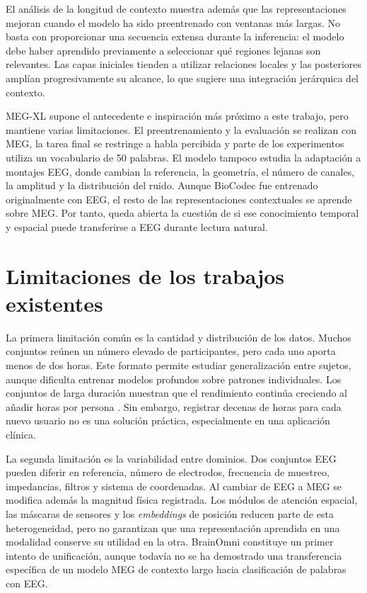 El análisis de la longitud de contexto muestra además que las representaciones mejoran cuando el modelo ha sido preentrenado con ventanas más largas. No basta con proporcionar una secuencia extensa durante la inferencia: el modelo debe haber aprendido previamente a seleccionar qué regiones lejanas son relevantes. Las capas iniciales tienden a utilizar relaciones locales y las posteriores amplían progresivamente su alcance, lo que sugiere una integración jerárquica del contexto.

MEG-XL supone el antecedente e inspiración más próximo a este trabajo, pero mantiene varias limitaciones. El preentrenamiento y la evaluación se realizan con MEG, la tarea final se restringe a habla percibida y parte de los experimentos utiliza un vocabulario de 50 palabras. El modelo tampoco estudia la adaptación a montajes EEG, donde cambian la referencia, la geometría, el número de canales, la amplitud y la distribución del ruido. Aunque BioCodec fue entrenado originalmente con EEG, el resto de las representaciones contextuales se aprende sobre MEG. Por tanto, queda abierta la cuestión de si ese conocimiento temporal y espacial puede transferirse a EEG durante lectura natural.

\section{Limitaciones de los trabajos existentes}

La primera limitación común es la cantidad y distribución de los datos. Muchos conjuntos reúnen un número elevado de participantes, pero cada uno aporta menos de dos horas. Este formato permite estudiar generalización entre sujetos, aunque dificulta entrenar modelos profundos sobre patrones individuales. Los conjuntos de larga duración muestran que el rendimiento continúa creciendo al añadir horas por persona \cite{sato2024scaling,ozdogan2025libribrain,dascoli2024words}. Sin embargo, registrar decenas de horas para cada nuevo usuario no es una solución práctica, especialmente en una aplicación clínica.

La segunda limitación es la variabilidad entre dominios. Dos conjuntos EEG pueden diferir en referencia, número de electrodos, frecuencia de muestreo, impedancias, filtros y sistema de coordenadas. Al cambiar de EEG a MEG se modifica además la magnitud física registrada. Los módulos de atención espacial, las máscaras de sensores y los \textit{embeddings} de posición reducen parte de esta heterogeneidad, pero no garantizan que una representación aprendida en una modalidad conserve su utilidad en la otra. BrainOmni constituye un primer intento de unificación, aunque todavía no se ha demostrado una transferencia específica de un modelo MEG de contexto largo hacia clasificación de palabras con EEG.

